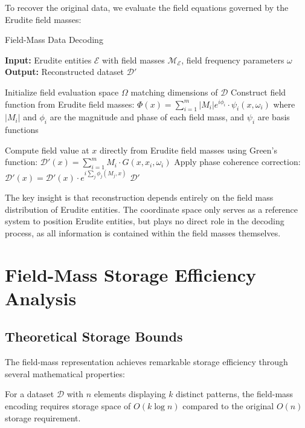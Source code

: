 To recover the original data, we evaluate the field equations governed by the Erudite field masses:

\begin{algorithm}[h]
\caption{Field-Mass Data Decoding}
\begin{algorithmic}[1]
\State \textbf{Input:} Erudite entities $\mathcal{E}$ with field masses $\mathcal{M}_{\mathcal{E}}$, field frequency parameters $\omega$
\State \textbf{Output:} Reconstructed dataset $\mathcal{D'}$

\State Initialize field evaluation space $\Omega$ matching dimensions of $\mathcal{D}$
\State Construct field function from Erudite field masses:
\State \hspace{1em} $\Phi(x) = \sum_{i=1}^m |M_i| e^{i\phi_i} \cdot \psi_i(x, \omega_i)$
\State where $|M_i|$ and $\phi_i$ are the magnitude and phase of each field mass, and $\psi_i$ are basis functions

  \State Compute field value at $x$ directly from Erudite field masses using Green's function:
  \State \hspace{1em} $\mathcal{D'}(x) = \sum_{i=1}^m M_i \cdot G(x, x_i, \omega_i)$
  \State Apply phase coherence correction:
  \State \hspace{1em} $\mathcal{D'}(x) = \mathcal{D'}(x) \cdot e^{i\sum_j \phi_j(M_j,x)}$
\EndFor
\State \Return $\mathcal{D'}$
\end{algorithmic}
\end{algorithm}

The key insight is that reconstruction depends entirely on the field mass distribution of Erudite entities. The coordinate space only serves as a reference system to position Erudite entities, but plays no direct role in the decoding process, as all information is contained within the field masses themselves.

\section{Field-Mass Storage Efficiency Analysis}

\subsection{Theoretical Storage Bounds}

The field-mass representation achieves remarkable storage efficiency through several mathematical properties:

\begin{theorem}
For a dataset $\mathcal{D}$ with $n$ elements displaying $k$ distinct patterns, the field-mass encoding requires storage space of $O(k \log n)$ compared to the original $O(n)$ storage requirement.
\end{theorem}

